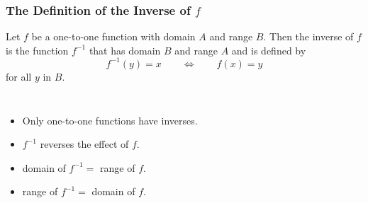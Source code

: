 \begin{frame}
\frametitle{The Definition of the Inverse of $f$}
\begin{definition}[$f^{-1}$]
Let $f$ be a one-to-one function with domain $A$ and range $B$.  Then the inverse of $f$ is the function $f^{-1}$ that has domain $B$ and range $A$ and is defined by
\[
f^{-1}(y) = x \qquad \Leftrightarrow \qquad f(x) = y 
\]
for all $y$ in $B$.
\end{definition}
\begin{columns}[T]
\begin{itemize}
\item<3->  Only one-to-one functions have inverses.
\item<4->  $f^{-1}$ reverses the effect of $f$.
\item<5->  domain of $f^{-1} = $ range of $f$.
\item<5->  range of $f^{-1} = $ domain of $f$.
\end{itemize}
\end{columns}
\end{frame}
